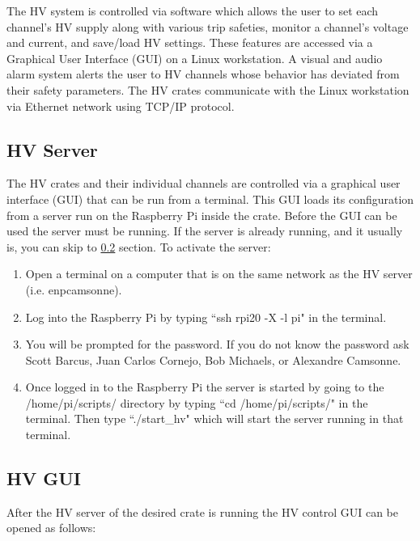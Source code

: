 \documentclass[oneside]{book}   %
\begin{document}
The HV system is controlled via software which allows the user to set each channel's HV supply along with various trip safeties, monitor a channel's voltage and current, and save/load HV settings. These features are accessed via a Graphical User Interface (GUI) on a Linux workstation. A visual and audio alarm system alerts the user to HV channels whose behavior has deviated from their safety parameters. The HV crates communicate with the Linux workstation via Ethernet network using TCP/IP protocol.

\subsection{HV Server}
\label{hv_server}

The HV crates and their individual channels are controlled via a graphical user interface (GUI) that can be run from a terminal. This GUI loads its configuration from a server run on the Raspberry Pi inside the crate. Before the GUI can be used the server must be running. If the server is already running, and it usually is, you can skip to \ref{hv_gui} section. To activate the server:

\begin{enumerate}
	\item Open a terminal on a computer that is on the same network as the HV server (i.e. enpcamsonne).
	\item Log into the Raspberry Pi by typing ``ssh rpi20 -X -l pi" in the terminal.
	\item You will be prompted for the password. If you do not know the password ask Scott Barcus, Juan Carlos Cornejo, Bob Michaels, or Alexandre Camsonne. 
	\item Once logged in to the Raspberry Pi the server is started by going to the /home/pi/scripts/ directory by typing ``cd /home/pi/scripts/" in the terminal. Then type ``./start\_hv" which will start the server running in that terminal.
	
\end{enumerate}

\subsection{HV GUI}
\label{hv_gui}

After the HV server of the desired crate is running the HV control GUI can be opened as follows:
\end{document}
